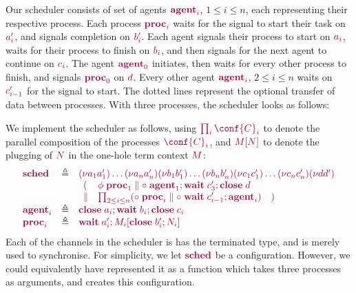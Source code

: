\documentclass[main.tex]{subfiles}
\begin{document}
Our scheduler consists of set of agents $\tm{\agent{i}}$, $1\leq{i}\leq{n}$, each representing their respective process. Each process $\tm{\proc{i}}$ waits for the signal to start their task on $\tm{a'_i}$, and signals completion on $\tm{b'_i}$. Each agent signals their process to start on $\tm{a_i}$, waits for their process to finish on $\tm{b_i}$, and then signals for the next agent to continue on $\tm{c_i}$. The agent $\tm{\agent0}$ initiates, then waits for every other process to finish, and signals $\tm{\proc0}$ on $\tm{d}$. Every other agent $\tm{\agent{i}}$, $2\leq{i}\leq{n}$ waits on $\tm{c'_{i-1}}$ for the signal to start. The dotted lines represent the optional transfer of data between processes. With three processes, the scheduler looks as follows:

We implement the scheduler as follows, using $\tm{\prod_{i}\conf{C}_i}$ to denote the parallel composition of the processes $\tm{\conf{C}_i}$, and $\tm{\plug{M}{N}}$ to denote the plugging of $\tm{N}$ in the one-hole term context $\tm{M}$:
\[
  \begin{array}{lrlr}
    \tm{\sched}
    & \defeq & \tm{\res{a_1}{a'_1}{\dots{\res{a_n}{a'_n}{}}}}
               \tm{\res{b_1}{b'_1}{\dots{\res{b_n}{b'_n}{}}}}
               \tm{\res{c_1}{c'_1}{\dots{\res{c_n}{c'_n}{}}}}
               \tm{\res{d}{d'}{}}
    \\ &     & \tm{\begin{array}{lll}
                     (
                     & \phi\;\proc1
                     \parallel
                     \child\;\andthen{\agent1}{\andthen{\wait\;{c'_3}}{\close\;{d}}}
                     \\
                     \parallel
                     &
                     \prod_{2\leq{i}\leq{n}}
                     (\child\;\proc{i} \parallel \child\;\andthen{\wait\;{c'_{i-1}}}{\agent{i}})
                     & )
                   \end{array}}
    \\
    \tm{\agent{i}}
    & \defeq & \tm{\andthen{\close\;{a_i}}{\andthen{\wait\;{b_i}}{\close\;{c_i}}}}
    \\
    \tm{\proc{i}}
    & \defeq & \tm{\andthen{\wait\;{a'_i}}{\plug{M_i}{\andthen{\close\;{b'_i}}{N_i}}}}
  \end{array}
\]
Each of the channels in the scheduler is has the terminated type, and is merely used to synchronise.
For simplicity, we let $\tm{\sched}$ be a configuration. However, we could equivalently have represented it as a function which takes three processes as arguments, and creates this configuration.
\end{document}

